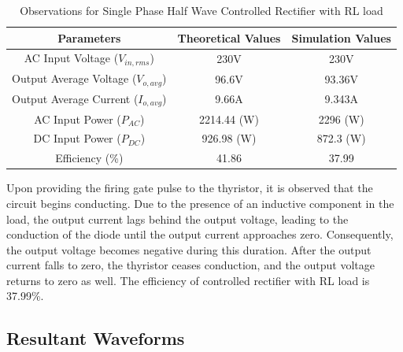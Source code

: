 \begin{table}[h]
    \renewcommand{\arraystretch}{1.3}
    \label{table_observation_single-phase-half-wave-controlled-rectifier-with-RL-load}
    \centering
    \begin{tabular}{|c|c|c|}
        \hline
        Parameters                              & Theoretical Values & Simulation Values \\
        \hline
        \hline
        AC Input Voltage ($ V_{in,rms} $)       & 230V               & 230V              \\
        \hline
        Output Average Voltage ($ V_{o,avg} $)  & 96.6V              & 93.36V            \\
        \hline
        Output Average Current ($ I_{o,avg}  $) & 9.66A              & 9.343A            \\
        \hline
        AC Input Power ($ P_{AC}  $)            & 2214.44 (W)        & 2296 (W)          \\
        \hline
        DC Input Power ($ P_{DC}  $)            & 926.98 (W)         & 872.3 (W)         \\
        \hline
        Efficiency (\%)                         & 41.86              & 37.99             \\
        \hline
    \end{tabular}
    \caption{Observations for Single Phase Half Wave Controlled Rectifier with RL load}

\end{table}


Upon providing the firing gate pulse to the thyristor, it is observed that the circuit begins conducting. Due to the presence of an inductive component in the load, the output current lags behind the output voltage, leading to the conduction of the diode until the output current approaches zero. Consequently, the output voltage becomes negative during this duration. After the output current falls to zero, the thyristor ceases conduction, and the output voltage returns to zero as well.
The efficiency of controlled
rectifier with RL load is 37.99\%.



\subsection{Resultant Waveforms}

